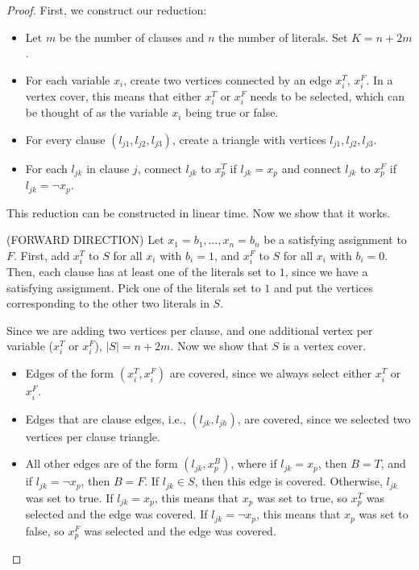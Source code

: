 \begin{proof}
First, we construct our reduction:
\begin{itemize}
    \item Let $m$ be the number of clauses and $n$ the number of literals. Set $K=n+2m$. 
    \item For each variable $x_i$, create two vertices connected by an edge $x_i^T$, $x_i^F$. In a vertex cover, this means that either $x_i^T$ or $x_i^F$ needs to be selected, which can be thought of as the variable $x_i$ being true or false. 
    \item For every clause $(l_{j1}, l_{j2}, l_{j3})$, create a triangle with vertices $l_{j1}, l_{j2}, l_{j3}$. 
    \item For each $l_{jk}$ in clause $j$, connect $l_{jk}$ to $x_p^T$ if $l_{jk}=x_p$ and connect $l_{jk}$ to $x_p^F$ if $l_{jk}=\neg x_p$. 
\end{itemize}

This reduction can be constructed in linear time. Now we show that it works. 

\hrulebar

(FORWARD DIRECTION) Let $x_1=b_1, \hdots, x_n=b_n$ be a satisfying assignment to $F$. First, add $x_i^T$ to $S$ for all $x_i$ with $b_i=1$, and $x_i^F$ to $S$ for all $x_i$ with $b_i=0$. Then, each clause has at least one of the literals set to $1$, since we have a satisfying assignment. Pick one of the literals set to $1$ and put the vertices corresponding to the other two literals in $S$. 

Since we are adding two vertices per clause, and one additional vertex per variable ($x_i^T$ or $x_i^F$), $\vert S\vert = n+2m$. Now we show that $S$ is a vertex cover. 
\begin{itemize}
    \item Edges of the form $(x_i^T, x_i^F)$ are covered, since we always select either $x_i^T$ or $x_i^F$. 
    \item Edges that are clause edges, i.e., $(l_{jk}, l_{jh})$, are covered, since we selected two vertices per clause triangle. 
    \item All other edges are of the form $(l_{jk}, x_p^B)$, where if $l_{jk}=x_p$, then $B=T$, and if $l_{jk}=\neg x_p$, then $B=F$. If $l_{jk}\in S$, then this edge is covered. Otherwise, $l_{jk}$ was set to true. If $l_{jk}=x_p$, this means that $x_p$ was set to true, so $x_p^T$ was selected and the edge was covered. If $l_{jk}=\neg x_p$, this means that $x_p$ was set to false, so $x_p^F$ was selected and the edge was covered. 
\end{itemize}


\end{proof}
